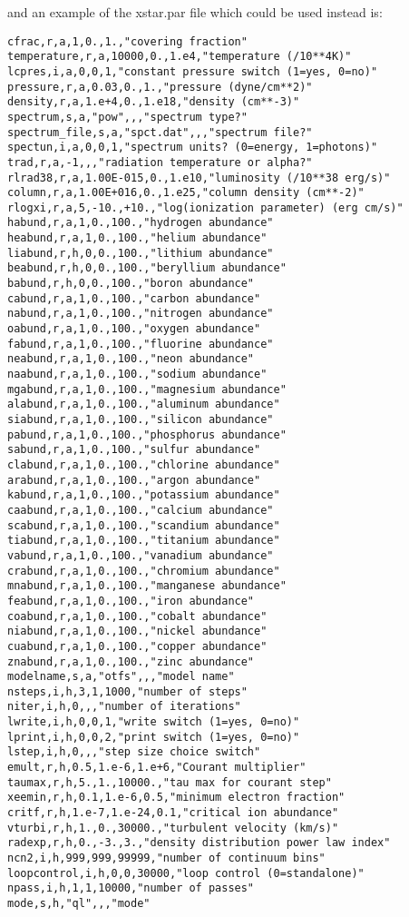 and an example of the xstar.par file which could be used instead is:

\begin{verbatim}
cfrac,r,a,1,0.,1.,"covering fraction"
temperature,r,a,10000,0.,1.e4,"temperature (/10**4K)"
lcpres,i,a,0,0,1,"constant pressure switch (1=yes, 0=no)"
pressure,r,a,0.03,0.,1.,"pressure (dyne/cm**2)"
density,r,a,1.e+4,0.,1.e18,"density (cm**-3)"
spectrum,s,a,"pow",,,"spectrum type?"
spectrum_file,s,a,"spct.dat",,,"spectrum file?"
spectun,i,a,0,0,1,"spectrum units? (0=energy, 1=photons)"
trad,r,a,-1,,,"radiation temperature or alpha?"
rlrad38,r,a,1.00E-015,0.,1.e10,"luminosity (/10**38 erg/s)"
column,r,a,1.00E+016,0.,1.e25,"column density (cm**-2)"
rlogxi,r,a,5,-10.,+10.,"log(ionization parameter) (erg cm/s)"
habund,r,a,1,0.,100.,"hydrogen abundance"
heabund,r,a,1,0.,100.,"helium abundance"
liabund,r,h,0,0.,100.,"lithium abundance"
beabund,r,h,0,0.,100.,"beryllium abundance"
babund,r,h,0,0.,100.,"boron abundance"
cabund,r,a,1,0.,100.,"carbon abundance"
nabund,r,a,1,0.,100.,"nitrogen abundance"
oabund,r,a,1,0.,100.,"oxygen abundance"
fabund,r,a,1,0.,100.,"fluorine abundance"
neabund,r,a,1,0.,100.,"neon abundance"
naabund,r,a,1,0.,100.,"sodium abundance"
mgabund,r,a,1,0.,100.,"magnesium abundance"
alabund,r,a,1,0.,100.,"aluminum abundance"
siabund,r,a,1,0.,100.,"silicon abundance"
pabund,r,a,1,0.,100.,"phosphorus abundance"
sabund,r,a,1,0.,100.,"sulfur abundance"
clabund,r,a,1,0.,100.,"chlorine abundance"
arabund,r,a,1,0.,100.,"argon abundance"
kabund,r,a,1,0.,100.,"potassium abundance"
caabund,r,a,1,0.,100.,"calcium abundance"
scabund,r,a,1,0.,100.,"scandium abundance"
tiabund,r,a,1,0.,100.,"titanium abundance"
vabund,r,a,1,0.,100.,"vanadium abundance"
crabund,r,a,1,0.,100.,"chromium abundance"
mnabund,r,a,1,0.,100.,"manganese abundance"
feabund,r,a,1,0.,100.,"iron abundance"
coabund,r,a,1,0.,100.,"cobalt abundance"
niabund,r,a,1,0.,100.,"nickel abundance"
cuabund,r,a,1,0.,100.,"copper abundance"
znabund,r,a,1,0.,100.,"zinc abundance"
modelname,s,a,"otfs",,,"model name"
nsteps,i,h,3,1,1000,"number of steps"
niter,i,h,0,,,"number of iterations"
lwrite,i,h,0,0,1,"write switch (1=yes, 0=no)"
lprint,i,h,0,0,2,"print switch (1=yes, 0=no)"
lstep,i,h,0,,,"step size choice switch"
emult,r,h,0.5,1.e-6,1.e+6,"Courant multiplier"
taumax,r,h,5.,1.,10000.,"tau max for courant step"
xeemin,r,h,0.1,1.e-6,0.5,"minimum electron fraction"
critf,r,h,1.e-7,1.e-24,0.1,"critical ion abundance"
vturbi,r,h,1.,0.,30000.,"turbulent velocity (km/s)"
radexp,r,h,0.,-3.,3.,"density distribution power law index"
ncn2,i,h,999,999,99999,"number of continuum bins"
loopcontrol,i,h,0,0,30000,"loop control (0=standalone)"
npass,i,h,1,1,10000,"number of passes"
mode,s,h,"ql",,,"mode"
\end{verbatim}

